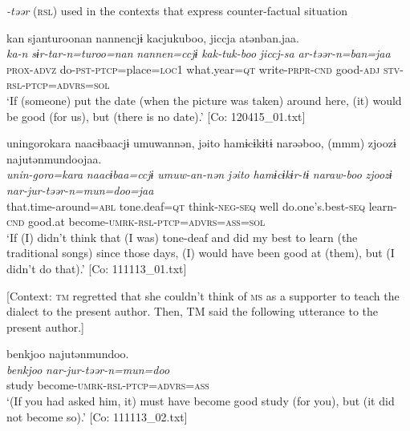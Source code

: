 \ea\label{ex:8-141}
  \textit{-təər} (\textsc{rsl}) used in the contexts that express counter-factual situation

\ea
{\TM}
\glll  kan  sjanturoonan  {\textbar}nannen{\textbar}cjɨ  kacjukuboo,      jiccja  atənban.jaa.  \\
\textit{ka-n}  \textit{sɨr-tar-n=turoo=nan}  \textit{nannen=ccjɨ}  \textit{kak-tuk-boo}      \textit{jiccj-sa}  \textit{ar-təər-n=ban=jaa}\\
\textsc{prox}-\textsc{advz}  do-\textsc{pst}-\textsc{ptcp}=place=\textsc{loc1}  what.year=\textsc{qt}  write-\textsc{prpr}-\textsc{cnd}  good-\textsc{adj}  \textsc{stv}-\textsc{rsl}-\textsc{ptcp}=\textsc{advrs}=\textsc{sol}\\
\glt ‘If (someone) put the date (when the picture was taken) around here, (it) would be good (for us), but (there is no date).’ [Co: 120415\_01.txt]

\ex
{\TM}
\glll  unin{\textbar}goro{\textbar}kara  naacɨbaacjɨ  umuwannən,  jəito  hamɨcɨkɨtɨ      narəəboo,  (mmm)  zjoozɨ  najutənmundoojaa.\\
\textit{unin-goro=kara}  \textit{naacɨbaa=ccjɨ}  \textit{umuw-an-nən}  \textit{jəito}  \textit{hamɨcɨkɨr-tɨ}      \textit{naraw-boo}    \textit{zjoozɨ}  \textit{nar-jur-təər-n=mun=doo=jaa}\\
that.time-around=\textsc{abl}  tone.deaf=\textsc{qt}  think-\textsc{neg}-\textsc{seq}  well  do.one’s.best-\textsc{seq}  learn-\textsc{cnd}    good.at  become-\textsc{umrk}-\textsc{rsl}-\textsc{ptcp}=\textsc{advrs}=\textsc{ass}=\textsc{sol}\\
\glt ‘If (I) didn’t think that (I was) tone-deaf and did my best to learn (the traditional songs) since those days, (I) would have been good at (them), but (I didn’t do that).’ [Co: 111113\_01.txt]

\ex {}[Context: \textsc{tm} regretted that she couldn’t think of \textsc{ms} as a supporter to teach the dialect to the present author. Then, TM said the following utterance to the present author.]

{\TM}
\glll  {\textbar}benkjoo{\textbar}  najutənmundoo.\\
\textit{benkjoo}  \textit{nar-jur-təər-n=mun=doo}\\
study  become-\textsc{umrk}-\textsc{rsl}-\textsc{ptcp}=\textsc{advrs}=\textsc{ass}\\
\glt ‘(If you had asked him, it) must have become good study (for you), but (it did not become so).’ [Co: 111113\_02.txt]
\z
\z

